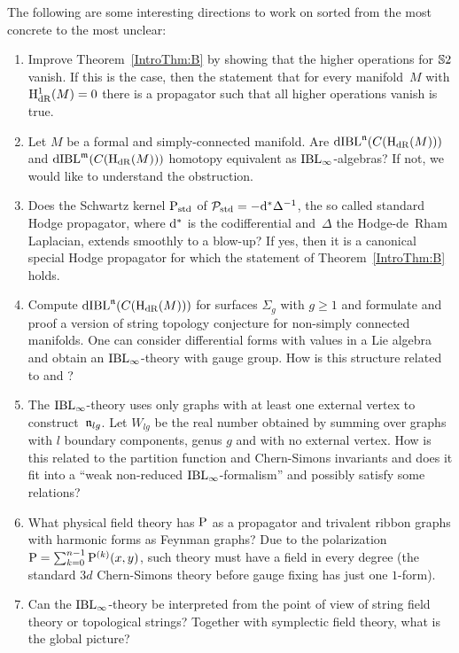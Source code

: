 \documentclass[\MainFolder/Text.tex]{subfiles}
\begin{document}
The following are some interesting directions to work on sorted from the most concrete to the most unclear:

\begin{enumerate}[label=(\arabic*)]
\item Improve Theorem~\ref{IntroThm:B} by showing that the higher operations for $\mathbb{S}{2}$ vanish. If this is the case, then the statement that for every manifold~$M$ with $\mathrm{H}_{\mathrm{dR}}^1(M)=0$ there is a propagator such that all higher operations vanish is true.
\item Let $M$ be a formal and simply-connected manifold. Are  $\mathrm{dIBL}^{\mathfrak{n}}(C(\mathrm{H}_{\mathrm{dR}}(M)))$ and $\mathrm{dIBL}^{\mathfrak{m}}(C(\mathrm{H}_{\mathrm{dR}}(M)))$ homotopy equivalent as $\mathrm{IBL}_\infty$-algebras? If not, we would like to understand the obstruction. 
\item Does the Schwartz kernel $\mathrm{P}_{\mathrm{std}}$ of $\mathcal{P}_{\mathrm{std}}=-\mathrm{d}^* \Delta^{-1}$, the so called standard Hodge propagator, where $\mathrm{d}^*$ is the codifferential and~$\Delta$ the Hodge-de~Rham Laplacian, extends smoothly to a blow-up? If yes, then it is a canonical special Hodge propagator for which the statement of Theorem~\ref{IntroThm:B} holds.
\item Compute $\mathrm{dIBL}^{\mathfrak{n}}(C(\mathrm{H}_{\mathrm{dR}}(M)))$ for surfaces $\Sigma_g$ with $g\ge 1$ and formulate and proof a version of string topology conjecture for non-simply connected manifolds. One can consider differential forms with values in a Lie algebra and obtain an $\mathrm{IBL}_\infty$-theory with gauge group. How is this structure related to \cite{Goldman1986} and \cite{Andersen1996}?
\item The $\mathrm{IBL}_\infty$-theory uses only graphs with at least one external vertex to construct~$\mathfrak{n}_{lg}$. Let $W_{lg}$ be the real number obtained by summing over graphs with $l$ boundary components, genus $g$ and with no external vertex. How is this related to the partition function and Chern-Simons invariants and does it fit into a ``weak non-reduced $\mathrm{IBL}_\infty$-formalism'' and possibly satisfy some relations?
\item What physical field theory has $\mathrm{P}$ as a propagator and trivalent ribbon graphs with harmonic forms as Feynman graphs?
Due to the polarization $\mathrm{P} = \sum_{k=0}^{n-1}\mathrm{P}^{(k)}(x,y)$, such theory must have a field in every degree (the standard $3d$ Chern-Simons theory before gauge fixing has just one $1$-form).
\item Can the $\mathrm{IBL}_\infty$-theory be interpreted from the point of view of string field theory or topological strings? Together with symplectic field theory, what is the global picture?
\end{enumerate}
\end{document}
